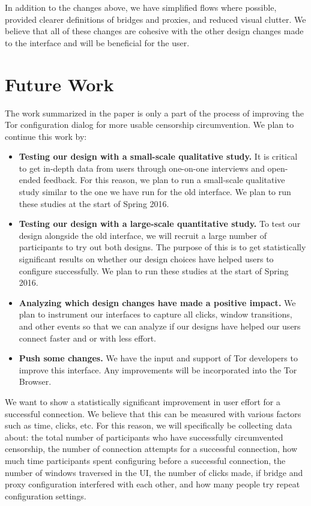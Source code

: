 \documentclass{template}
\begin{document}
In addition to the changes above, we have simplified flows where possible,
provided clearer definitions of bridges and proxies, and reduced visual clutter.
We believe that all of these changes are cohesive with the other design changes
made to the interface and will be beneficial for the user.

\section{Future Work}

The work summarized in the paper is only a part of the process of improving the Tor configuration
dialog for more usable censorship circumvention. We plan to continue this work by:

\begin{itemize} \itemsep1pt \parskip0pt  
\item {\bfseries Testing our design with a small-scale qualitative study.} It is
    critical to get in-depth data from users through one-on-one interviews and
    open-ended feedback. For this reason, we plan to run a small-scale
    qualitative study similar to the one we have run for the old interface. We
    plan to run these studies at the start of Spring 2016.
\item {\bfseries Testing our design with a large-scale quantitative study.} To
    test our design alongside the old interface, we will recruit a large number
    of participants to try out both designs. The purpose of this is to get
    statistically significant results on whether our design choices have helped
    users to configure successfully. We plan to run these studies at the start
    of Spring 2016.
\item {\bfseries Analyzing which design changes have made a positive impact.} We plan to instrument our interfaces to capture all clicks, window transitions, and other events so that we can analyze if our designs have helped our users connect faster and or with less effort. 
\item {\bfseries Push some changes.} We have the input and support of Tor developers
to improve this interface. Any improvements will be incorporated into the Tor Browser.
\end{itemize}

 We want to show a statistically significant improvement in user effort for a successful connection. We believe that this can be measured with various factors such as time, clicks, etc. For this reason, we will specifically be collecting data about: the total number of participants who have successfully circumvented censorship, the number of connection attempts for a successful connection, how much time participants spent configuring before a successful connection, the number of windows traversed in the UI, the number of clicks made, if bridge and proxy configuration interfered with each other, and how many people try repeat configuration settings. 
\end{document}
